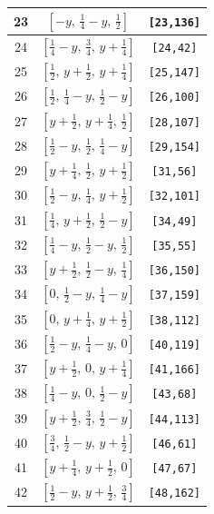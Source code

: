 \documentclass[fleqn,8pt]{jsarticle}
\begin{document}
\begin{longtable}{ccc}
23 & $\left[ - y,\, \frac{1}{4} - y,\, \frac{1}{2} \right]$ & {\tt [23,136]} \\ \hline
24 & $\left[ \frac{1}{4} - y,\, \frac{3}{4},\, y + \frac{1}{4} \right]$ & {\tt [24,42]} \\ \hline
25 & $\left[ \frac{1}{2},\, y + \frac{1}{2},\, y + \frac{1}{4} \right]$ & {\tt [25,147]} \\ \hline
26 & $\left[ \frac{1}{2},\, \frac{1}{4} - y,\, \frac{1}{2} - y \right]$ & {\tt [26,100]} \\ \hline
27 & $\left[ y + \frac{1}{2},\, y + \frac{1}{4},\, \frac{1}{2} \right]$ & {\tt [28,107]} \\ \hline
28 & $\left[ \frac{1}{2} - y,\, \frac{1}{2},\, \frac{1}{4} - y \right]$ & {\tt [29,154]} \\ \hline
29 & $\left[ y + \frac{1}{4},\, \frac{1}{2},\, y + \frac{1}{2} \right]$ & {\tt [31,56]} \\ \hline
30 & $\left[ \frac{1}{2} - y,\, \frac{1}{4},\, y + \frac{1}{2} \right]$ & {\tt [32,101]} \\ \hline
31 & $\left[ \frac{1}{4},\, y + \frac{1}{2},\, \frac{1}{2} - y \right]$ & {\tt [34,49]} \\ \hline
32 & $\left[ \frac{1}{4} - y,\, \frac{1}{2} - y,\, \frac{1}{2} \right]$ & {\tt [35,55]} \\ \hline
33 & $\left[ y + \frac{1}{2},\, \frac{1}{2} - y,\, \frac{1}{4} \right]$ & {\tt [36,150]} \\ \hline
34 & $\left[ 0,\, \frac{1}{2} - y,\, \frac{1}{4} - y \right]$ & {\tt [37,159]} \\ \hline
35 & $\left[ 0,\, y + \frac{1}{4},\, y + \frac{1}{2} \right]$ & {\tt [38,112]} \\ \hline
36 & $\left[ \frac{1}{2} - y,\, \frac{1}{4} - y,\, 0 \right]$ & {\tt [40,119]} \\ \hline
37 & $\left[ y + \frac{1}{2},\, 0,\, y + \frac{1}{4} \right]$ & {\tt [41,166]} \\ \hline
38 & $\left[ \frac{1}{4} - y,\, 0,\, \frac{1}{2} - y \right]$ & {\tt [43,68]} \\ \hline
39 & $\left[ y + \frac{1}{2},\, \frac{3}{4},\, \frac{1}{2} - y \right]$ & {\tt [44,113]} \\ \hline
40 & $\left[ \frac{3}{4},\, \frac{1}{2} - y,\, y + \frac{1}{2} \right]$ & {\tt [46,61]} \\ \hline
41 & $\left[ y + \frac{1}{4},\, y + \frac{1}{2},\, 0 \right]$ & {\tt [47,67]} \\ \hline
42 & $\left[ \frac{1}{2} - y,\, y + \frac{1}{2},\, \frac{3}{4} \right]$ & {\tt [48,162]} \\ \hline

\end{longtable}
\end{document}

